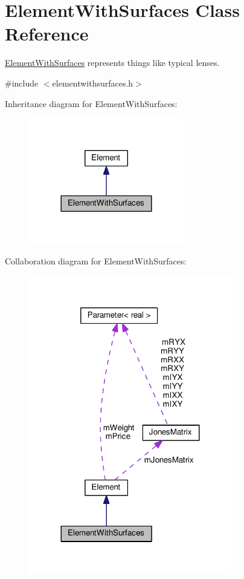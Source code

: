 \hypertarget{classElementWithSurfaces}{}\section{Element\+With\+Surfaces Class Reference}
\label{classElementWithSurfaces}


\hyperlink{classElementWithSurfaces}{Element\+With\+Surfaces} represents things like typical lenses.  




{\ttfamily \#include $<$elementwithsurfaces.\+h$>$}



Inheritance diagram for Element\+With\+Surfaces\+:\nopagebreak
\begin{figure}[H]
\begin{center}
\leavevmode
\includegraphics[width=192pt]{classElementWithSurfaces__inherit__graph}
\end{center}
\end{figure}


Collaboration diagram for Element\+With\+Surfaces\+:
\nopagebreak
\begin{figure}[H]
\begin{center}
\leavevmode
\includegraphics[width=251pt]{classElementWithSurfaces__coll__graph}
\end{center}
\end{figure}
